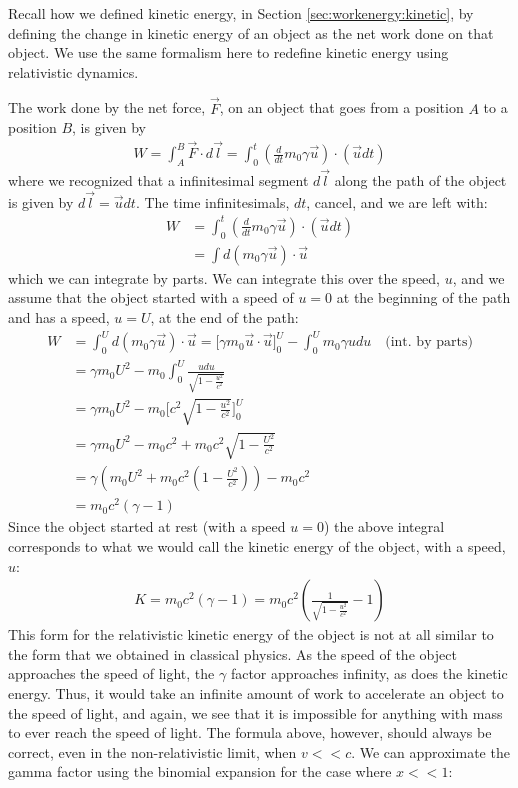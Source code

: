 Recall how we defined kinetic energy, in Section \ref{sec:workenergy:kinetic}, by defining the change in kinetic energy of an object as the net work done on that object. We use the same formalism here to redefine kinetic energy using relativistic dynamics.

The work done by the net force, $\vec F$, on an object that goes from a position $A$ to a position $B$, is given by
\begin{align*}
W = \int_A^B \vec F\cdot d\vec l=\int_0^t \left(\frac{d}{dt}m_0\gamma\vec u \right)\cdot(\vec u dt)
\end{align*}
where we recognized that a infinitesimal segment $d\vec l$ along the path of the object is given by $d\vec l=\vec u dt$. The time infinitesimals, $dt$, cancel, and we are left with:
\begin{align*}
W&=\int_0^t \left(\frac{d}{dt}m_0\gamma\vec u \right)\cdot(\vec u dt)\\
&=\int d(m_0\gamma \vec u)\cdot \vec u
\end{align*}
which we can integrate by parts. We can integrate this over the speed, $u$, and we assume that the object started with a speed of $u=0$ at the beginning of the path and has a speed, $u=U$, at the end of the path:
\begin{align*}
W&=\int_0^U d(m_0\gamma \vec u)\cdot \vec u = \Big[\gamma m_0 \vec u\cdot\vec u\Big]_0^U-\int_0^U m_0\gamma u du\quad\text{(int. by parts)}\\
&=\gamma m_0 U^2-m_0\int_0^U\frac{udu}{\sqrt{1-\frac{u^2}{c^2}}}\\
&=\gamma m_0 U^2-m_0\Big[ c^2\sqrt{1-\frac{u^2}{c^2}} \Big]_0^U\\
&=\gamma m_0 U^2-m_0c^2+m_0c^2\sqrt{1-\frac{U^2}{c^2}}\\
&=\gamma \left(m_0 U^2+m_0c^2\left(1-\frac{U^2}{c^2}\right)\right)-m_0c^2\\
&=m_0c^2(\gamma -1)	
\end{align*}
Since the object started at rest (with a speed $u=0$) the above integral corresponds to what we would call the kinetic energy of the object, with a speed, $u$:
\begin{align*}
K=m_0c^2(\gamma -1)=m_0c^2\left(\frac{1}{\sqrt{1-\frac{u^2}{c^2}}}-1\right)
\end{align*}
This form for the relativistic kinetic energy of the object is not at all similar to the form that we obtained in classical physics. As the speed of the object approaches the speed of light, the $\gamma$ factor approaches infinity, as does the kinetic energy. Thus, it would take an infinite amount of work to accelerate an object to the speed of light, and again, we see that it is impossible for anything with mass to ever reach the speed of light. The formula above, however, should always be correct, even in the non-relativistic limit, when $v<<c$. We can approximate the gamma factor using the binomial expansion for the case where $x<<1$:
